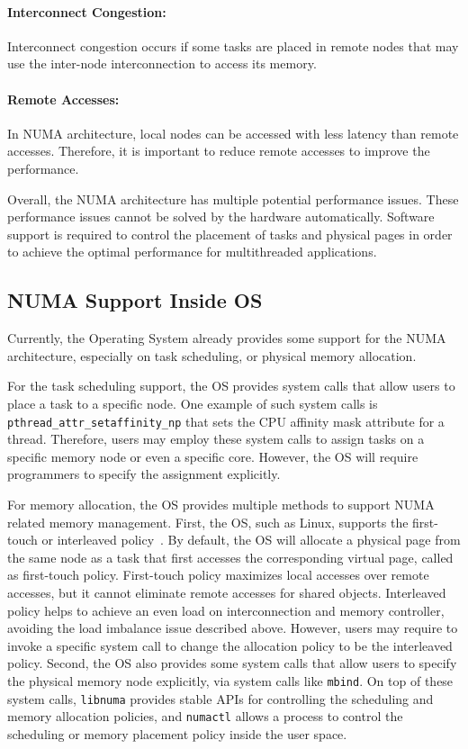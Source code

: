\paragraph{Interconnect Congestion:} Interconnect congestion occurs if some tasks are placed in remote nodes that may use the inter-node interconnection to access its memory. 

\paragraph{Remote Accesses:} In NUMA architecture, local nodes can be accessed with less latency than remote accesses. Therefore, it is important to reduce remote accesses to improve the performance.


Overall, the NUMA architecture has multiple potential performance issues. These performance issues cannot be solved by the hardware automatically. Software support is required to control the placement of tasks and physical pages in order to achieve the optimal performance for multithreaded applications.  

\subsection{NUMA Support Inside OS}

Currently, the Operating System already provides some support for the NUMA architecture, especially on task scheduling, or physical memory allocation. 

For the task scheduling support, the OS provides  system calls that allow users to place a task to a specific node. One example of such system calls is \texttt{pthread\_attr\_setaffinity\_np} that   sets the CPU affinity mask attribute  for a thread. Therefore, users may employ these system calls to assign tasks on a specific memory node or even a specific core. However, the OS will require programmers to specify the assignment explicitly. 

For memory allocation, the OS provides multiple methods to support NUMA related memory management. First, the OS, such as Linux, supports the first-touch or interleaved policy~\cite{lameter2013numa, diener2015locality}. By default, the OS will allocate a physical page from the same node as a task that first accesses the corresponding virtual page, called as first-touch policy. First-touch policy maximizes local accesses over remote accesses, but it  cannot eliminate remote accesses for shared objects. Interleaved policy helps to achieve an even load on interconnection and memory controller, avoiding the load imbalance issue described above. However, users may require to invoke a specific system call to change the allocation policy to be the interleaved policy.  Second, the OS also provides some system calls that allow users to specify the physical memory node explicitly, via system calls like \texttt{mbind}. On top of these system calls, \texttt{libnuma} provides stable APIs for controlling the scheduling and memory allocation policies, and \texttt{numactl} allows a process to control the scheduling or memory placement policy inside the user space. 

